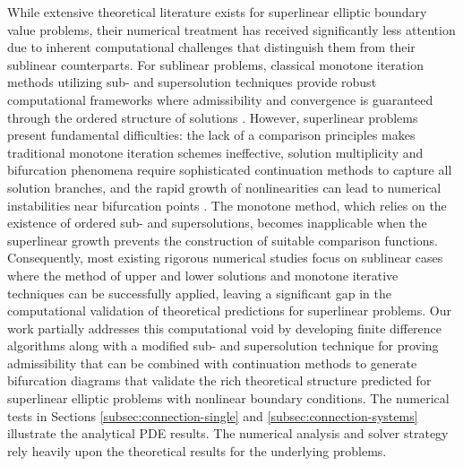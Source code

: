 \documentclass[12pt, reqno]{amsart}
\numberwithin{equation}{section}
\begin{document}
While extensive theoretical literature exists for superlinear elliptic boundary value problems, their numerical treatment has received significantly less attention due to inherent computational challenges that distinguish them from their sublinear counterparts. For sublinear problems, classical monotone iteration methods utilizing sub- and supersolution techniques provide robust computational frameworks where admissibility and convergence is guaranteed through the ordered structure of solutions \cite{Pao_book,Sattinger1973,Lewis_Morris_Zhang_2022}. However, superlinear problems present fundamental difficulties: the lack of a comparison principles makes traditional monotone iteration schemes ineffective, solution multiplicity and bifurcation phenomena require sophisticated continuation methods to capture all solution branches, and the rapid growth of nonlinearities can lead to numerical instabilities near bifurcation points \cite{BCDMP_2024,Mavinga-Pardo_PRSE_2017}. The monotone method, which relies on the existence of ordered sub- and supersolutions, becomes inapplicable when the superlinear growth prevents the construction of suitable comparison functions. Consequently, most existing rigorous numerical studies focus on sublinear cases where the method of upper and lower solutions and monotone iterative techniques can be successfully applied, leaving a significant gap in the computational validation of theoretical predictions for superlinear problems. Our work partially addresses this computational void by developing finite difference algorithms along with a modified sub- and supersolution technique for proving admissibility that can be combined with continuation methods to generate bifurcation diagrams that validate the rich theoretical structure predicted for superlinear elliptic problems with nonlinear boundary conditions. The numerical tests in Sections \ref{subsec:connection-single} and \ref{subsec:connection-systems} illustrate the analytical PDE results.  The numerical analysis and solver strategy rely heavily upon the theoretical results for the underlying problems.  
\end{document}
